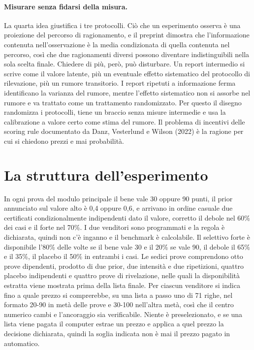 \documentclass[11pt,a4paper]{article}
\begin{document}
\paragraph{Misurare senza fidarsi della misura.}
La quarta idea giustifica i tre protocolli. Ci\`o che un esperimento osserva \`e una proiezione del percorso di ragionamento, e il preprint dimostra che l'informazione contenuta nell'osservazione \`e la media condizionata di quella contenuta nel percorso, cos\`i che due ragionamenti diversi possono diventare indistinguibili nella sola scelta finale. Chiedere di pi\`u, per\`o, pu\`o disturbare. Un report intermedio si scrive come il valore latente, pi\`u un eventuale effetto sistematico del protocollo di rilevazione, pi\`u un rumore transitorio. I report ripetuti a informazione ferma identificano la varianza del rumore, mentre l'effetto sistematico non si assorbe nel rumore e va trattato come un trattamento randomizzato. Per questo il disegno randomizza i protocolli, tiene un braccio senza misure intermedie e usa la calibrazione a valore certo come stima del rumore. Il problema di incentivi delle scoring rule documentato da Danz, Vesterlund e Wilson (2022) \`e la ragione per cui si chiedono prezzi e mai probabilit\`a.

\section{La struttura dell'esperimento}

In ogni prova del modulo principale il bene vale 30 oppure 90 punti, il prior annunciato sul valore alto \`e 0,4 oppure 0,6, e arrivano in ordine casuale due certificati condizionalmente indipendenti dato il valore, corretto il debole nel 60\% dei casi e il forte nel 70\%. I due venditori sono programmati e la regola \`e dichiarata, quindi non c'\`e inganno e il benchmark \`e calcolabile. Il selettivo forte \`e disponibile l'80\% delle volte se il bene vale 30 e il 20\% se vale 90, il debole il 65\% e il 35\%, il placebo il 50\% in entrambi i casi. Le sedici prove comprendono otto prove dipendenti, prodotto di due prior, due intensit\`a e due ripetizioni, quattro placebo indipendenti e quattro prove di rivelazione, nelle quali la disponibilit\`a estratta viene mostrata prima della lista finale. Per ciascun venditore si indica fino a quale prezzo si comprerebbe, su una lista a passo uno di 71 righe, nel formato 20-90 in met\`a delle prove e 30-100 nell'altra met\`a, cos\`i che il centro numerico cambi e l'ancoraggio sia verificabile. Niente \`e preselezionato, e se una lista viene pagata il computer estrae un prezzo e applica a quel prezzo la decisione dichiarata, quindi la soglia indicata non \`e mai il prezzo pagato in automatico.
\end{document}
